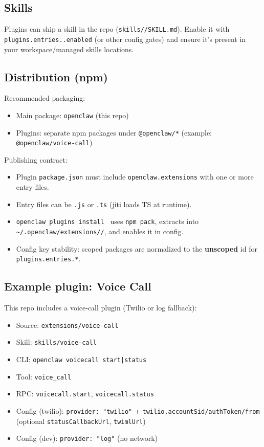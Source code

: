 \subsection{Skills}


Plugins can ship a skill in the repo (\texttt{skills//SKILL.md}).
Enable it with \texttt{plugins.entries..enabled} (or other config gates) and ensure
it’s present in your workspace/managed skills locations.

\subsection{Distribution (npm)}


Recommended packaging:

\begin{itemize}
  \item Main package: \texttt{openclaw} (this repo)
  \item Plugins: separate npm packages under \texttt{@openclaw/*} (example: \texttt{@openclaw/voice-call})
\end{itemize}


Publishing contract:

\begin{itemize}
  \item Plugin \texttt{package.json} must include \texttt{openclaw.extensions} with one or more entry files.
  \item Entry files can be \texttt{.js} or \texttt{.ts} (jiti loads TS at runtime).
  \item \texttt{openclaw plugins install } uses \texttt{npm pack}, extracts into \texttt{\textasciitilde{}/.openclaw/extensions//}, and enables it in config.
  \item Config key stability: scoped packages are normalized to the \textbf{unscoped} id for \texttt{plugins.entries.*}.
\end{itemize}


\subsection{Example plugin: Voice Call}


This repo includes a voice‑call plugin (Twilio or log fallback):

\begin{itemize}
  \item Source: \texttt{extensions/voice-call}
  \item Skill: \texttt{skills/voice-call}
  \item CLI: \texttt{openclaw voicecall start|status}
  \item Tool: \texttt{voice\_call}
  \item RPC: \texttt{voicecall.start}, \texttt{voicecall.status}
  \item Config (twilio): \texttt{provider: "twilio"} + \texttt{twilio.accountSid/authToken/from} (optional \texttt{statusCallbackUrl}, \texttt{twimlUrl})
  \item Config (dev): \texttt{provider: "log"} (no network)
\end{itemize}


